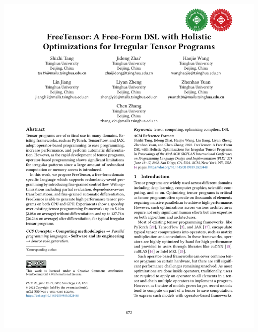 \documentclass[12pt,aspectratio=169]{beamer}
\begin{document}
\begin{frame}
\begin{columns}
\begin{column}{0.5\textwidth}
                \includegraphics[page=5,trim=1.9cm 8.5cm 11cm 12cm,clip,scale=.9]{paper.pdf}
            \end{column}
        \end{columns}
    \end{frame}
\end{document}
